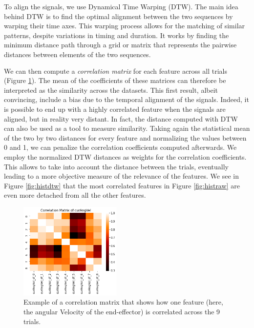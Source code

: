 \documentclass[conference]{IEEEtran}
\begin{document}
To align the signals, we use Dynamical Time Warping (DTW). The main idea behind DTW is to find the optimal alignment between the two sequences by warping their time axes. This warping process allows for the matching of similar patterns, despite variations in timing and duration. It works by finding the minimum distance path through a grid or matrix that represents the pairwise distances between elements of the two sequences. \newline


We can then compute a \textit{correlation matrix} for each feature across all trials (Figure \ref{fig:corrMat}). The mean of the coefficients of these matrices can therefore be interpreted as the similarity across the datasets. This first result, albeit convincing, include a bias due to the temporal alignment of the signals. Indeed, it is possible to end up with a highly correlated feature when the signals are aligned, but in reality very distant. In fact, the distance computed with DTW can also be used as a tool to measure similarity. Taking again the statistical mean of the two by two distances for every feature and normalizing the values between 0 and 1, we can penalize the correlation coefficients computed afterwards. We employ the normalized DTW distances as weights for the correlation coefficients. This allows to take into account the distance between the trials, eventually leading to a more objective measure of the relevance of the features. We see in Figure \ref{fig:histdtw} that the most correlated features in Figure \ref{fig:histraw} are even more detached from all the other features.  

\begin{figure}[ht]
  \centering
  \includegraphics[width=0.45\textwidth]{img/corr_matrix.png}
  \caption{Example of a correlation matrix that shows how one feature (here, the angular Velocity of the end-effector) is correlated across the 9 trials.}
  \label{fig:corrMat}
\end{figure}
\end{document}
